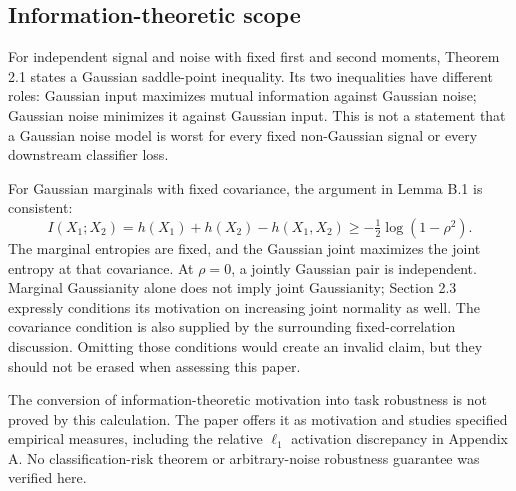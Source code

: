 \documentclass[10pt]{article}
\begin{document}
\subsection*{Information-theoretic scope}
For independent signal and noise with fixed first and second moments, Theorem 2.1 states a Gaussian saddle-point inequality. Its two inequalities have different roles: Gaussian input maximizes mutual information against Gaussian noise; Gaussian noise minimizes it against Gaussian input. This is not a statement that a Gaussian noise model is worst for every fixed non-Gaussian signal or every downstream classifier loss.\par
For Gaussian marginals with fixed covariance, the argument in Lemma B.1 is consistent: \[I(X_1;X_2)=h(X_1)+h(X_2)-h(X_1,X_2)
 \geq -\tfrac12\log(1-\rho^2).\] The marginal entropies are fixed, and the Gaussian joint maximizes the joint entropy at that covariance. At \(\rho=0\), a jointly Gaussian pair is independent. Marginal Gaussianity alone does not imply joint Gaussianity; Section 2.3 expressly conditions its motivation on increasing joint normality as well. The covariance condition is also supplied by the surrounding fixed-correlation discussion. Omitting those conditions would create an invalid claim, but they should not be erased when assessing this paper.\par
The conversion of information-theoretic motivation into task robustness is not proved by this calculation. The paper offers it as motivation and studies specified empirical measures, including the relative \(\ell_1\) activation discrepancy in Appendix A. No classification-risk theorem or arbitrary-noise robustness guarantee was verified here.\par
\end{document}
